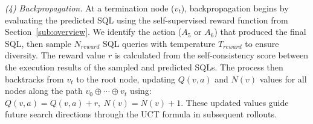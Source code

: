 \textit{(4) Backpropagation.}
At a termination node ($v_t$), backpropagation begins by evaluating the predicted SQL using the self-supervised reward function from Section~\ref{sub:overview}. 
We identify the action ($A_5$ or $A_6$) that produced the final SQL, then sample $N_{reward}$ SQL queries with temperature $T_{reward}$ to ensure diversity. The reward value $r$ is calculated from the self-consistency score between the execution results of the sampled and predicted SQLs.
The process then backtracks from $v_t$ to the root node, updating $Q(v,a)$ and $N(v)$ values for all nodes along the path $v_0 \oplus \cdots \oplus v_t$ using: $
Q(v, a) = Q(v,a) + r,~N(v) = N(v) + 1$.
% 
These updated values guide future search directions through the UCT formula in subsequent rollouts.

